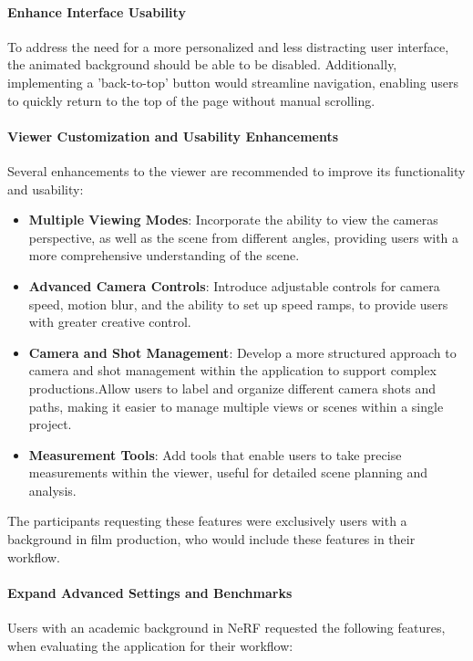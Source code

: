 \paragraph{Enhance Interface Usability}
To address the need for a more personalized and less distracting user interface, the animated background should be able to be disabled.
Additionally, implementing a 'back-to-top' button would streamline navigation, enabling users to quickly return to the top of the page without manual scrolling. 
\cite{P10}

\paragraph{Viewer Customization and Usability Enhancements}
Several enhancements to the viewer are recommended to improve its functionality and usability:

\begin{itemize}
  \item \textbf{Multiple Viewing Modes}: Incorporate the ability to view the cameras perspective, as well as the scene from different angles, providing users with a more comprehensive understanding of the scene. 
  \cite{P5}
  \item \textbf{Advanced Camera Controls}: Introduce adjustable controls for camera speed, motion blur, and the ability to set up speed ramps, to provide users with greater creative control. 
  \cite{P5}
  \item \textbf{Camera and Shot Management}: Develop a more structured approach to camera and shot management within the application to support complex productions.Allow users to label and organize different camera shots and paths, making it easier to manage multiple views or scenes within a single project.
  \cite{P5}
  \item \textbf{Measurement Tools}: Add tools that enable users to take precise measurements within the viewer, useful for detailed scene planning and analysis. 
  \cite{P7}
\end{itemize}

The participants requesting these features were exclusively users with a background in film production, who would include these features in their workflow.

\paragraph{Expand Advanced Settings and Benchmarks}
Users with an academic background in NeRF requested the following features, when evaluating the application for their workflow:

